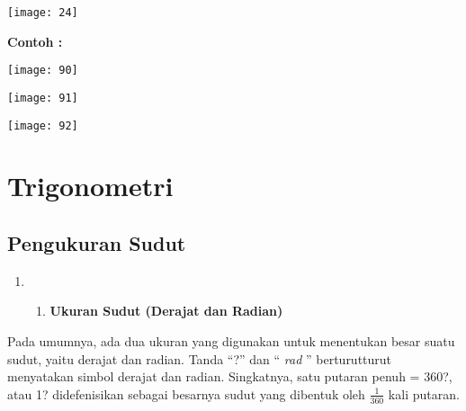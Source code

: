 \documentclass[11pt,fleqn]{book} %
\begin{document}
\begin{myEnumerate}
\begin{itemize}
\begin{center}
\texttt{[image: 24]}
\end{center}

\textbf{Contoh :}

\begin{center}
\texttt{[image: 90]}
\end{center}

\begin{center}
\texttt{[image: 91]}
\end{center}

\begin{center}
\texttt{[image: 92]}
\end{center}

\noindent




\chapter{Trigonometri}

\section{Pengukuran Sudut}


\begin{enumerate}
\item \begin{enumerate}
\item  \textbf{Ukuran Sudut  (Derajat dan Radian) }
\end{enumerate}
\end{enumerate}

Pada umumnya, ada dua ukuran yang digunakan untuk menentukan besar suatu sudut, yaitu derajat dan radian.  Tanda ``?'' dan `` \textit{rad} '' berturutturut menyatakan simbol derajat dan radian. Singkatnya, satu putaran penuh = 360?, atau 1? didefenisikan sebagai besarnya sudut yang dibentuk oleh $\frac{1}{360}$ kali putaran.


\end{itemize}
\end{myEnumerate}
\end{document}

